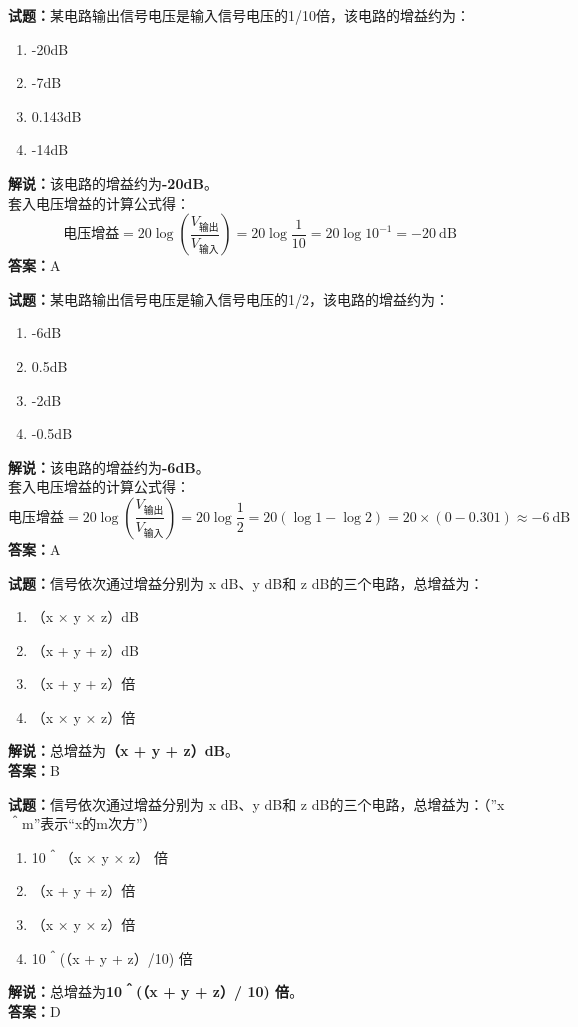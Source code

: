 \documentclass{ctexbook}
\begin{document}
\bigskip




\noindent\textbf{试题：}某电路输出信号电压是输入信号电压的1/10倍，该电路的增益约为：
\begin{enumerate}[leftmargin=3em]
\item -20dB
\item -7dB
\item 0.143dB
\item -14dB
\end{enumerate}
\noindent\textbf{解说：}该电路的增益约为\textbf{-20dB}。\\
套入电压增益的计算公式得：
$$\mbox{电压增益}=20 \log \left( {\frac{V_{ \mbox{输出} }}{V_{ \mbox{输入} }}} \right)=20 \log \frac{1}{10}=20 \log 10^{-1}= -20 \ \mathrm{dB}$$
\noindent\textbf{答案：}A

\bigskip




\noindent\textbf{试题：}某电路输出信号电压是输入信号电压的1/2，该电路的增益约为：
\begin{enumerate}[leftmargin=3em]
\item -6dB
\item 0.5dB
\item -2dB
\item -0.5dB
\end{enumerate}
\noindent\textbf{解说：}该电路的增益约为\textbf{-6dB}。\\
套入电压增益的计算公式得：
$$\mbox{电压增益}=20 \log \left( {\frac{V_{ \mbox{输出} }}{V_{ \mbox{输入} }}} \right)=20 \log \frac{1}{2}=20 \left( \log 1 - \log 2 \right) = 20 \times \left( 0 - 0.301 \right) \approx -6 \ \mathrm{dB}$$
\noindent\textbf{答案：}A

\bigskip




\noindent\textbf{试题：}信号依次通过增益分别为 x dB、y dB和 z dB的三个电路，总增益为：
\begin{enumerate}[leftmargin=3em]
\item （x × y × z）dB
\item （x + y + z）dB
\item （x + y + z）倍
\item （x × y × z）倍
\end{enumerate}
\noindent\textbf{解说：}总增益为\textbf{（x + y + z）dB}。\\\noindent\textbf{答案：}B

\bigskip




\noindent\textbf{试题：}信号依次通过增益分别为 x dB、y dB和 z dB的三个电路，总增益为：（”x＾m”表示“x的m次方”）
\begin{enumerate}[leftmargin=3em]
\item 10＾（x × y × z） 倍
\item （x + y + z）倍
\item （x × y × z）倍
\item 10＾(（x + y + z）/10) 倍
\end{enumerate}
\noindent\textbf{解说：}总增益为\textbf{10＾(（x + y + z）/ 10) 倍}。\\\noindent\textbf{答案：}D
\end{document}
